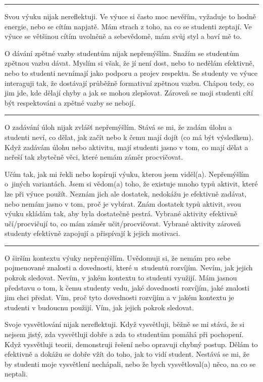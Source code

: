 \rule{\textwidth}{0.4pt}
{Svou výuku nijak nereflektuji.}
{Ve výuce si často moc nevěřím, vyžaduje to hodně energie, nebo se cítím napjatě. Mám strach z toho, na co se studenti zeptají.}
{Ve výuce se většinou cítím uvolněně a sebevědomě, mám svůj styl a baví mě to.}

\newpage
{}
{O dávání zpětné vazby studentům nijak nepřemýšlím.}
{Snažím se studentům zpětnou vazbu dávat. Myslím si však, že jí není dost, nebo to nedělám efektivně, nebo to studenti nevnímají jako podporu a projev respektu.}
{Se studenty ve výuce interaguji tak, že dostávají průběžně formativní zpětnou vazbu. Chápou tedy, co jim jde, kde dělají chyby a jak se mohou zlepšovat. Zároveň se moji studenti cítí být respektováni a zpětné vazby se nebojí.}

\rule{\textwidth}{0.4pt}
{O zadávání úloh nijak zvlášť nepřemýšlím.}
{Stává se mi, že zadám úlohu a studenti neví, co dělat, jak začít nebo k čemu mají dojít (co má být výsledkem).}
{Když zadávám úlohu nebo aktivitu, mají studenti jasno v tom, co mají dělat a neřeší tak zbytečně věci, které nemám záměr procvičovat.}

\newpage
{}
{Učím tak, jak mi řekli nebo kopíruji výuku, kterou jsem viděl(a). Nepřemýšlím o~jiných variantách.}
{Jsem si vědom(a) toho, že existuje mnoho typů aktivit, které lze při výuce použít. Neznám jich ale dostatek, nedokážu je efektivně zadávat, nebo nemám jasno v tom, proč je vybírat.}
{Znám dostatek typů aktivit, svou výuku skládám tak, aby byla dostatečně pestrá. Vybrané aktivity efektivně učí/procvičují to, co mám záměr učit/procvičovat. Vybrané aktivity zároveň studenty efektivně zapojují a přispívají k jejich motivaci.\vspace{-0.5em}}

\rule{\textwidth}{0.4pt}
{O širším kontextu výuky nepřemýšlím.}
{Uvědomuji si, že nemám pro sebe pojmenované znalosti a dovednosti, které u~studentů rozvíjím. Nevím, jak jejich pokrok sledovat. Nevím, v jakém kontextu to studenti využijí.}
{Mám jasnou představu o tom, k čemu studenty vedu, jaké dovednosti rozvíjím, jaké znalosti jim chci předat. Vím, proč tyto dovednosti rozvíjím a v jakém kontextu je studenti v budoucnu použijí. Vím, jak jejich pokrok sledovat.}
\vspace*{-1em}

\newpage
{}
{Svoje vysvětlování nijak nereflektuji.}
{Když vysvětluji, běžně se mi stává, že si nejsem jistý, zda vysvětluji dobře a zda to studentům pomáhá při pochopení.}
{Když vysvětluji teorii, demonstruji řešení nebo opravuji chybný postup. Dělám to efektivně a dokážu se dobře vžít do toho, jak to vidí student. Nestává se mi, že by studenti moje vysvětlení nechápali, nebo že bych vysvětloval(a) něco, na co se neptali.}

